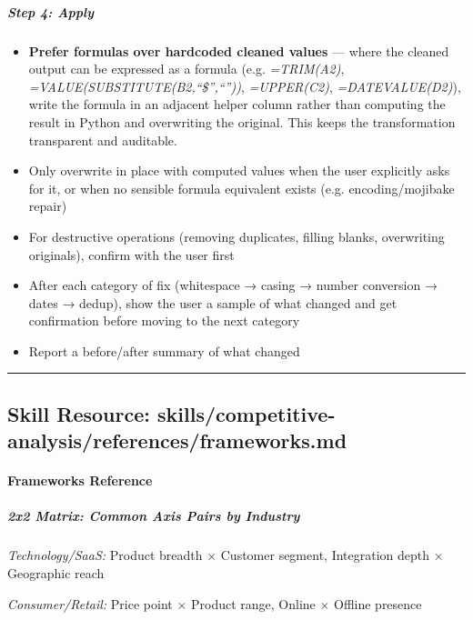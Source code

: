 \documentclass[11pt]{article}
\begin{document}
\subparagraph{Step 4: Apply}\mbox{}\par

\begin{itemize}[leftmargin=*,itemsep=2pt,topsep=2pt]
\item {} \textbf{Prefer formulas over hardcoded cleaned values} — where the cleaned output can be expressed as a formula (e.g. \emph{=TRIM(A2)}, \emph{=VALUE(SUBSTITUTE(B2,``\$'',``''))}, \emph{=UPPER(C2)}, \emph{=DATEVALUE(D2)}), write the formula in an adjacent helper column rather than computing the result in Python and overwriting the original. This keeps the transformation transparent and auditable.
\item {} Only overwrite in place with computed values when the user explicitly asks for it, or when no sensible formula equivalent exists (e.g. encoding/mojibake repair)
\item {} For destructive operations (removing duplicates, filling blanks, overwriting originals), confirm with the user first
\item {} After each category of fix (whitespace → casing → number conversion → dates → dedup), show the user a sample of what changed and get confirmation before moving to the next category
\item {} Report a before/after summary of what changed
\end{itemize}

\vspace{0.8em}\hrule\vspace{0.8em}

\subsection{Skill Resource: skills/competitive-analysis/references/frameworks.md}\label{file:skills-competitive-analysis-references-frameworks-md}

\paragraph{Frameworks Reference}\mbox{}\par

\subparagraph{2x2 Matrix: Common Axis Pairs by Industry}\mbox{}\par

\emph{Technology/SaaS:} Product breadth × Customer segment, Integration depth × Geographic reach


\emph{Consumer/Retail:} Price point × Product range, Online × Offline presence
\end{document}
